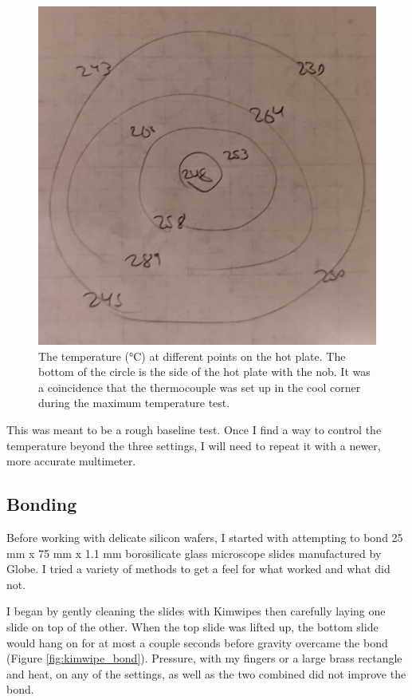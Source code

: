 \documentclass[colorlinks=true,pdfstartview=FitV,linkcolor=blue,
            citecolor=red,urlcolor=magenta]{ligodoc}
\begin{document}
\begin{figure}[htbp]
\begin{center}
\includegraphics[width=6in]{graphics/even_heating_test_results_PXL_20220729_050013935.jpg}
\caption{The temperature (°C) at different points on the hot plate. The bottom of the circle is the side of the hot plate with the nob. It was a coincidence that the  thermocouple was set up in the cool corner during the maximum temperature test.}
\label{fig:even_heating_test_results}
\end{center}
\end{figure}

This was meant to be a rough baseline test. Once I find a way to control the temperature beyond the three settings, I will need to repeat it with a newer, more accurate multimeter.

\subsection{Bonding}

Before working with delicate silicon wafers, I started with attempting to bond 25 mm x 75 mm x 1.1 mm borosilicate glass microscope slides manufactured by Globe. I tried a variety of methods to get a feel for what worked and what did not.

I began by gently cleaning the slides with Kimwipes then carefully laying one slide on top of the other. When the top slide was lifted up, the bottom slide would hang on for at most a couple seconds before gravity overcame the bond (Figure \ref{fig:kimwipe_bond}). Pressure, with my fingers or a large brass rectangle and heat, on any of the settings, as well as the two combined did not improve the bond.
\end{document}
